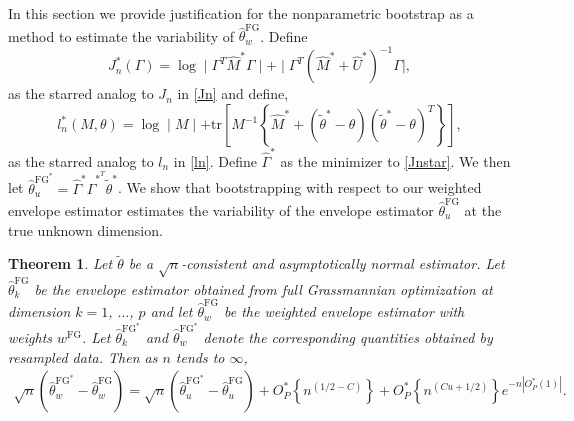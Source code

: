 \documentclass{article}\usepackage[]{graphicx}\usepackage[]{color}
\newcommand{\tr}{\text{tr}}
\newcommand{\Mstar}{\widehat{M}^{\textstyle{*}}}
\newcommand{\Ustar}{\widehat{U}^{\textstyle{*}}}
\newcommand{\TFG}{\widehat{\theta}^{\text{FG}}}
\newcommand{\Ttil}{\widetilde{\theta}}
\newcommand{\TstarFG}{\widehat{\theta}^{{\text{FG}}^{\textstyle{*}}}}
\newcommand{\Ttilstar}{\widetilde{\theta}^{\textstyle{*}}}
\newcommand{\Gamstar}{\widehat{\Gamma}^{\textstyle{*}}}
\newcommand{\GamstarT}{\widehat{\Gamma}^{\textstyle{*}^T}}
\newcommand{\rootn}{\sqrt{n}}
\newcommand{\EnvuFGstar}{\widehat{\theta}^{\text{FG}^{\textstyle{*}}}_u}
\newcommand{\wFG}{w^{\text{FG}}}
\newcommand{\X}{\mathbf{X}}
\newcommand{\Xstar}{\X^{\textstyle{*}}}
\newcommand{\Jstar}{J^{\textstyle{*}}}
\newcommand{\lstar}{l^{\textstyle{*}}}
\newtheorem{thm}{Theorem}
\begin{document}
In this section we provide justification for the nonparametric bootstrap as a method to estimate the variability of $\TFG_w$. Define 
\begin{equation} \label{Jnstar}
  \Jstar_n(\Gamma) = \log\mid\Gamma^T\Mstar\Gamma\mid 
    + \mid\Gamma^T\left(\Mstar + \Ustar\right)^{-1}\Gamma\mid, 
\end{equation}
as the starred analog to $J_n$ in \eqref{Jn} and define, 
\begin{equation} \label{lnstar}
  \lstar_n(M, \theta) = \log\mid M\mid + \tr\left[M^{-1}\left\{\Mstar  
    + (\Ttilstar - \theta)(\Ttilstar - \theta)^T\right\}\right], 
\end{equation}
as the starred analog to $l_n$ in \eqref{ln}. Define $\Gamstar$ as the minimizer to \eqref{Jnstar}. %
We then let $\EnvuFGstar = \Gamstar\GamstarT\Ttilstar$. %
We show that bootstrapping with respect to our weighted envelope estimator %
estimates the variability of the envelope estimator $\TFG_u$ at the true unknown dimension. %

\begin{thm}
Let $\Ttil$ be a $\rootn$-consistent and asymptotically normal estimator. Let $\TFG_k$ be the envelope estimator obtained from full Grassmannian optimization at dimension $k = 1$, $\ldots$, $p$ and let $\TFG_w$ be the weighted envelope estimator with weights $\wFG$. Let $\TstarFG_k$ and $\TstarFG_w$ denote the corresponding quantities obtained by resampled data. Then as $n$ tends to $\infty$,
\begin{equation}
\begin{split}
  \rootn\left(\TstarFG_w - \TFG_w\right) 
    = \rootn\left(\TstarFG_u - \TFG_u\right) 
    + O_P^{\textstyle{*}}\left\{n^{\left(1/2 - C\right)}\right\}
    + O_P^{\textstyle{*}}\left\{n^{(Cu + 1/2)}\right\}
      e^{-n|O_P^{\textstyle{*}}(1)|}.
\end{split}
\label{TFGterms}
\end{equation} 
\label{thm:TFG}
\end{thm}
\end{document}

